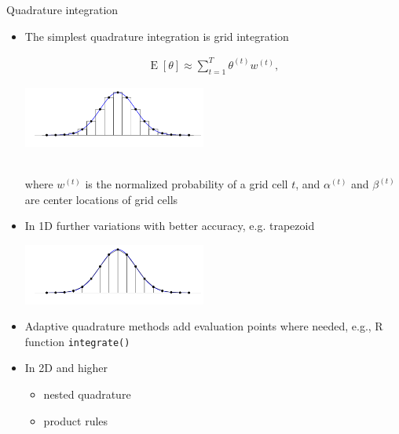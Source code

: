 \documentclass[english,t]{beamer}
\DeclareMathOperator{\E}{E}
\begin{document}
\begin{frame}{Quadrature integration}

  \begin{itemize}
  \item The simplest quadrature integration is grid integration\\
    \hspace{0cm}\begin{minipage}{3.5cm}
    \begin{align*}
      \E[\theta] \approx \sum_{t=1}^{T} \theta^{(t)}w^{(t)} ,
    \end{align*}
  \end{minipage}
  \begin{minipage}{6cm}
  \includegraphics[width=6cm]{norm1d_3c.pdf}
\end{minipage}\\
where $w^{(t)}$ is the normalized probability of a grid cell $t$, and $\alpha^{(t)}$ and $\beta^{(t)}$ are center locations of grid cells
\item<2-> In 1D further variations with better accuracy, e.g. trapezoid
  \begin{center}
    \includegraphics[width=6cm]{norm1d_3d.pdf}
  \end{center}
  \vspace{-0.7\baselineskip}
\item<3-> Adaptive quadrature methods add evaluation points where needed{\color{gray}, e.g., R function \texttt{integrate()}}
\item<4-> In 2D and higher
  \begin{itemize}
  \item nested quadrature
  \item product rules
  \end{itemize}
  \end{itemize}
  
\end{frame}
\end{document}
